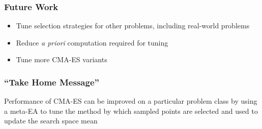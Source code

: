 \documentclass{beamer}
\begin{document}
	\begin{frame}
		\frametitle{Future Work}
		\begin{itemize}
			\item<1-|alert@1> Tune selection strategies for other problems, including real-world problems
			\item<2-|alert@2> Reduce \textit{a priori} computation required for tuning			
			\item<3-|alert@3> Tune more CMA-ES variants

		\end{itemize}
	\end{frame}
	
	\begin{frame}
		\frametitle{``Take Home Message''}
			Performance of CMA-ES can be improved on a particular problem class by using a meta-EA to tune the method by which sampled points are selected and used to update the search space mean
	\end{frame}
\end{document}
